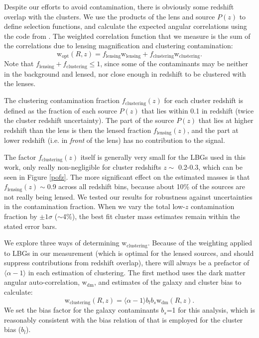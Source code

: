 Despite our efforts to avoid contamination, there is obviously some redshift overlap with the clusters. We use the products of the lens and source $P(z)$ to define selection functions, and calculate the expected angular correlations using the code from \citet{Hamana04}. The weighted correlation function that we measure is the sum of the correlations due to lensing magnification and clustering contamination:
\begin{equation}
\mathrm{w}_{\mathrm{opt}}(R,z) = f_{\mathrm{lensing}}\mathrm{w}_{\mathrm{lensing}} + f_{\mathrm{clustering}}\mathrm{w}_{\mathrm{clustering}}.
\end{equation}
Note that $f_{\mathrm{lensing}}+f_{\mathrm{clustering}} \leq 1$, since some of the contaminants may be neither in the background and lensed, nor close enough in redshift to be clustered with the lenses.

The clustering contamination fraction $f_{\mathrm{clustering}}(z)$ for each cluster redshift is defined as the fraction of each source $P(z)$ that lies within 0.1 in redshift (twice the cluster redshift uncertainty). The part of the source $P(z)$ that lies at higher redshift than the lens is then the lensed fraction $f_{\mathrm{lensing}}(z)$, and the part at lower redshift (i.e. in {\it front} of the lens) has no contribution to the signal.

The factor $f_{\mathrm{clustering}}(z)$ itself is generally very small for the \ac{LBG}s used in this work, only really non-negligible for cluster redshifts $z \sim$ 0.2-0.3, which can be seen in Figure \ref{pofz}. The more significant effect on the estimated masses is that $f_{\mathrm{lensing}}(z) \sim$0.9 across all redshift bins, because about 10\% of the sources are not really being lensed. We tested our results for robustness against uncertainties in the contamination fraction. When we vary the total low-$z$ contamination fraction by $\pm1\sigma$ ($\sim$4\%), the best fit cluster mass estimates remain within the stated error bars.


We explore three ways of determining $\mathrm{w}_{\mathrm{clustering}}$. Because of the weighting applied to \ac{LBG}s in our measurement (which is optimal for the lensed sources, and should suppress contributions from redshift overlap), there will always be a prefactor of $\langle \alpha-1 \rangle$ in each estimation of clustering. The first method uses the dark matter angular auto-correlation, $\mathrm{w}_{\mathrm{dm}}$, and estimates of the galaxy and cluster bias to calculate:
\begin{equation}
\mathrm{w}_{\mathrm{clustering}}(R,z) = \langle \alpha-1 \rangle b_{l} b_{s} \mathrm{w}_{\mathrm{dm}}(R,z).
\label{model1}
\end{equation}
We set the bias factor for the galaxy contaminants $b_s$=1 for this analysis, which is reasonably consistent with the bias relation of \citet{Seljak04} that is employed for the cluster bias ($b_{l}$).


